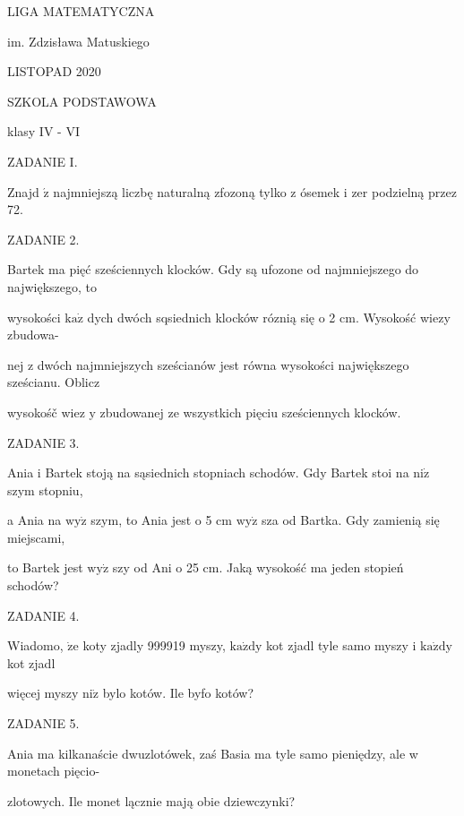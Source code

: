 \documentclass[a4paper,12pt]{article}
\begin{document}
LIGA MATEMATYCZNA

im. Zdzisława Matuskiego

LISTOPAD 2020

SZKOLA PODSTAWOWA

klasy IV - VI

ZADANIE I.

Znajd $\acute{\mathrm{z}}$ najmniejszą liczbę naturalną zfozoną tylko z ósemek i zer podzielną przez 72.

ZADANIE 2.

Bartek ma pięć sześciennych klocków. Gdy są ufozone od najmniejszego do największego, to

wysokości $\mathrm{k}\mathrm{a}\dot{\mathrm{z}}$ dych dwóch sqsiednich klocków róznią się o 2 cm. Wysokość wiezy zbudowa-

nej z dwóch najmniejszych sześcianów jest równa wysokości największego sześcianu. Oblicz

wysokośč wiez $\mathrm{y}$ zbudowanej ze wszystkich pięciu sześciennych klocków.

ZADANIE 3.

Ania i Bartek stoją na sąsiednich stopniach schodów. Gdy Bartek stoi na $\mathrm{n}\mathrm{i}\dot{\mathrm{z}}$ szym stopniu,

a Ania na $\mathrm{w}\mathrm{y}\dot{\mathrm{z}}$ szym, to Ania jest o 5 cm $\mathrm{w}\mathrm{y}\dot{\mathrm{z}}$ sza od Bartka. Gdy zamienią się miejscami,

to Bartek jest $\mathrm{w}\mathrm{y}\dot{\mathrm{z}}$ szy od Ani o 25 cm. Jaką wysokość ma jeden stopień schodów?

ZADANIE 4.

Wiadomo, $\dot{\mathrm{z}}\mathrm{e}$ koty zjadly 999919 myszy, $\mathrm{k}\mathrm{a}\dot{\mathrm{z}}\mathrm{d}\mathrm{y}$ kot zjadl tyle samo myszy i $\mathrm{k}\mathrm{a}\dot{\mathrm{z}}\mathrm{d}\mathrm{y}$ kot zjadl

więcej myszy $\mathrm{n}\mathrm{i}\dot{\mathrm{z}}$ bylo kotów. Ile byfo kotów?

ZADANIE 5.

Ania ma kilkanaście dwuzlotówek, zaś Basia ma tyle samo pieniędzy, ale w monetach pięcio-

zlotowych. Ile monet lącznie mają obie dziewczynki?
\end{document}
